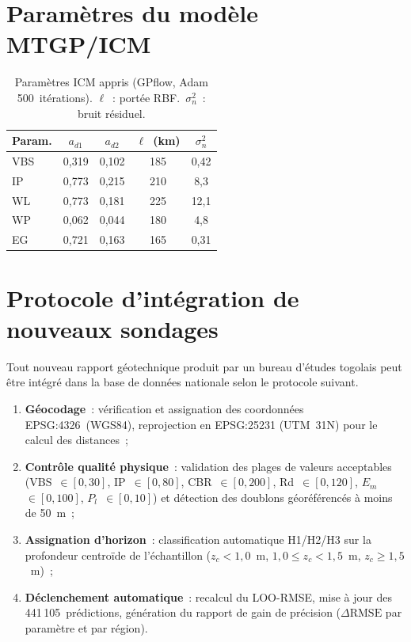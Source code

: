 \documentclass[10pt,a4paper,twocolumn]{article}
\begin{document}
	\section{Paramètres du modèle MTGP/ICM}
	\label{app:mtgp}
	
	\begin{table}[H]
		\centering\small
		\caption{Paramètres ICM appris (GPflow, Adam 500~itérations).
			$\ell$~: portée RBF.~$\sigma^2_n$~: bruit résiduel.}
		\label{tab:mtgp_params}
		\begin{tabular}{lcccc}
			\toprule
			Param. & $a_{d1}$ & $a_{d2}$ & $\ell$~(km) & $\sigma^2_n$ \\
			\midrule
			VBS & 0,319 & 0,102 & 185 & 0,42 \\
			IP  & 0,773 & 0,215 & 210 & 8,3  \\
			WL  & 0,773 & 0,181 & 225 & 12,1 \\
			WP  & 0,062 & 0,044 & 180 & 4,8  \\
			EG  & 0,721 & 0,163 & 165 & 0,31 \\
			\bottomrule
		\end{tabular}
	\end{table}
	
	\section{Protocole d'intégration de nouveaux sondages}
	\label{app:protocole}

	Tout nouveau rapport géotechnique produit par un bureau d'études
	togolais peut être intégré dans la base de données nationale selon
	le protocole suivant.

	\begin{enumerate}[label=\arabic*.,topsep=4pt]
		\item \textbf{Géocodage}~: vérification et assignation des
		coordonnées EPSG:4326~(WGS84), reprojection en EPSG:25231
		(UTM~31N) pour le calcul des distances~;

		\item \textbf{Contrôle qualité physique}~: validation des
		plages de valeurs acceptables
		(VBS~$\in[0,30]$, IP~$\in[0,80]$, CBR~$\in[0,200]$,
		Rd~$\in[0,120]$, $E_m$~$\in[0,100]$, $P_l$~$\in[0,10]$)
		et détection des doublons géoréférencés
		à moins de 50~m~;

		\item \textbf{Assignation d'horizon}~: classification
		automatique H1/H2/H3 sur la profondeur centroïde de
		l'échantillon ($z_c < 1{,}0$~m, $1{,}0 \leq z_c < 1{,}5$~m,
		$z_c \geq 1{,}5$~m)~;

		\item \textbf{Déclenchement automatique}~: recalcul du
		LOO-RMSE, mise à jour des 441\,105~prédictions, génération du
		rapport de gain de précision ($\Delta\mathrm{RMSE}$ par
		paramètre et par région).
	\end{enumerate}
\end{document}
